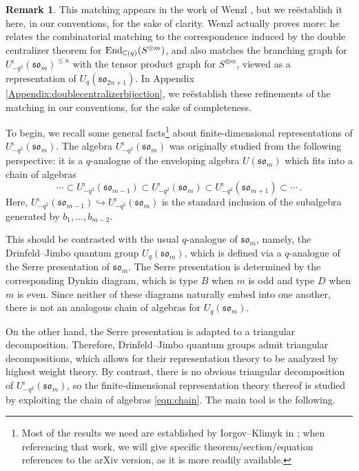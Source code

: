 \documentclass[10pt]{amsart}
\numberwithin{equation}{section}
\theoremstyle{definition}
\newtheorem{rem}[thm]{Remark}
\newcommand{\End}{{\rm End}}
\def\C{{\mathbb C}}
\newcommand{\son}[1][2n+1]{\mathfrak{so}_{#1}}
\newcommand{\som}[1][m]{\mathfrak{so}_{#1}}
\newcommand{\iqUsom}[1][m]{{U}^{\iota}_{-q^2}(\som[#1])}
\begin{document}
\begin{rem}\label{rem:Wenzldoesmore}
This matching appears in the work of Wenzl \cite[Theorem 5.3]{Wenzl-Spin}, 
but we re\"{e}stablish it here, in our conventions, for the sake of clarity. 
Wenzl actually proves more:
he relates the combinatorial matching to the correspondence induced by the double centralizer theorem for $\End_{\C(q)}(S^{\otimes m})$,
and also matches the branching graph for $\iqUsom^{\le n}$ with the tensor product graph for $S^{\otimes m}$, 
viewed as a representation of $U_q(\son)$. 
In Appendix \ref{Appendix:doublecentralizerbijection}, 
we re\"{e}stablish these refinements of the matching in our conventions, for the sake of completeness.  
\end{rem}


To begin, we recall some general facts\footnote{Most of the results we need are established 
by Iorgov--Klimyk in \cite{MR2143754};
when referencing that work, we will give
specific theorem/section/equation references to the arXiv version, as it is more readily available.} 
about finite-dimensional representations of $\iqUsom$.
The algebra $\iqUsom$ was originally studied from the following perspective: 
it is a $q$-analogue of the enveloping algebra $U(\som)$ which fits into a chain of algebras 
\begin{equation}\label{eqn:chain}
\cdots \subset  \iqUsom[m-1] \subset \iqUsom\subset \iqUsom[m+1] \subset \cdots \, .
\end{equation}
Here, $\iqUsom[m-1] \hookrightarrow \iqUsom$ is the standard inclusion 
of the subalgebra generated by $b_1,\ldots,b_{m-2}$.

This should be contrasted with the usual $q$-analogue of $\som$, 
namely, the Drinfeld--Jimbo quantum group $U_q(\mathfrak{so}_m)$,
which is defined via a $q$-analogue of the Serre presentation of $\mathfrak{so}_m$.
The Serre presentation is determined by the corresponding Dynkin diagram, 
which is type $B$ when $m$ is odd and type $D$ when $m$ is even.
Since neither of these diagrams naturally embed into one another, there is not 
an analogous chain of algebras for $U_q(\mathfrak{so}_m)$.

On the other hand, the Serre presentation is adapted to a triangular decomposition. 
Therefore, Drinfeld--Jimbo quantum groups admit triangular decompositions, 
which allows for their representation theory to be analyzed by highest weight theory. 
By contrast, there is no obvious triangular decomposition of $\iqUsom$, 
so the finite-dimensional representation theory thereof is studied 
by exploiting the chain of algebras \eqref{eqn:chain}.
The main tool is the following.
\end{document}
